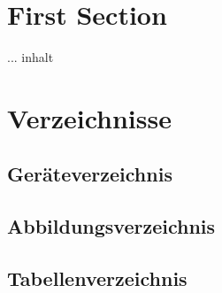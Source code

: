 \section{First Section}     %

... inhalt 

\newpage                    %
\section{Verzeichnisse}

\subsection{Geräteverzeichnis}

\subsection{Abbildungsverzeichnis}
\listoffigures

\subsection{Tabellenverzeichnis}
\listoftables               %